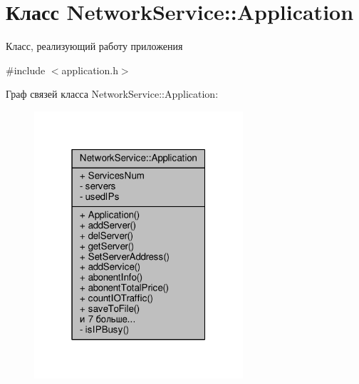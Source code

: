 \hypertarget{class_network_service_1_1_application}{}\section{Класс Network\+Service\+:\+:Application}
\label{class_network_service_1_1_application}


Класс, реализующий работу приложения  




{\ttfamily \#include $<$application.\+h$>$}



Граф связей класса Network\+Service\+:\+:Application\+:\nopagebreak
\begin{figure}[H]
\begin{center}
\leavevmode
\includegraphics[width=220pt]{class_network_service_1_1_application__coll__graph}
\end{center}
\end{figure}
